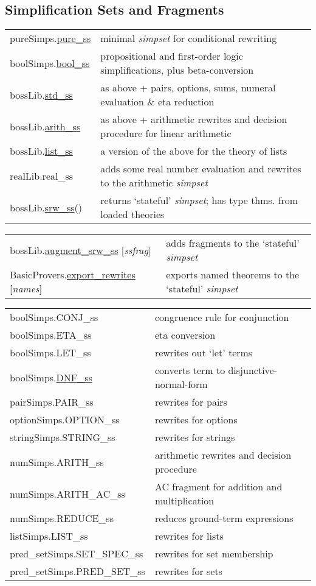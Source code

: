 \documentclass[landscape,10pt]{article}
\newcommand{\hol}[2]{{\sffamily #1.\href{http://hol.sourceforge.net/kananaskis-9-helpdocs/help/Docfiles/HTML/#1.#2.html}{#2}}}
\newcommand{\holnoref}[2]{{\sffamily #1.#2}}
\newcommand{\var}[1]{{\emph{#1}}}
\begin{document}
\begin{multicols}{2}
\subsection*{Simplification Sets and Fragments}
\begin{tabular}{ll}
\hol{pureSimps}{pure_ss} & minimal \emph{simpset} for conditional rewriting \\
\hol{boolSimps}{bool_ss} & propositional and first-order logic simplifications, plus beta-conversion \\
\hol{bossLib}{std_ss} & as above + pairs, options, sums, numeral evaluation \& eta reduction \\
\hol{bossLib}{arith_ss} & as above + arithmetic rewrites and decision procedure for linear arithmetic \\
\hol{bossLib}{list_ss} & a version of the above for the theory of lists \\
\holnoref{realLib}{real_ss} & adds some real number evaluation and rewrites to the arithmetic \emph{simpset} \\
\hol{bossLib}{srw_ss}() & returns `stateful' \emph{simpset}; has type thms. from loaded theories
\end{tabular}

\medskip
\noindent\begin{tabular}{ll}
\hol{bossLib}{augment_srw_ss} [\var{ssfrag}] & adds fragments to the `stateful' \emph{simpset} \\
\hol{BasicProvers}{export_rewrites} [\var{names}] & exports named theorems to the `stateful' \emph{simpset} \\
\end{tabular}


\noindent\begin{tabular}{ll}
\holnoref{boolSimps}{CONJ_ss} & congruence rule for conjunction \\
\holnoref{boolSimps}{ETA_ss} & eta conversion \\
\holnoref{boolSimps}{LET_ss} & rewrites out `let' terms \\
\hol{boolSimps}{DNF_ss} & converts term to disjunctive-normal-form\\
\holnoref{pairSimps}{PAIR_ss} & rewrites for pairs \\
\holnoref{optionSimps}{OPTION_ss} & rewrites for options \\
\holnoref{stringSimps}{STRING_ss} & rewrites for strings \\
\holnoref{numSimps}{ARITH_ss} & arithmetic rewrites and decision procedure \\
\holnoref{numSimps}{ARITH_AC_ss} & AC fragment for addition and multiplication \\
\holnoref{numSimps}{REDUCE_ss} & reduces ground-term expressions \\
\holnoref{listSimps}{LIST_ss} & rewrites for lists \\
\holnoref{pred_setSimps}{SET_SPEC_ss} & rewrites for set membership \\
\holnoref{pred_setSimps}{PRED_SET_ss} & rewrites for sets \\
\end{tabular}
\end{multicols}
\end{document}
